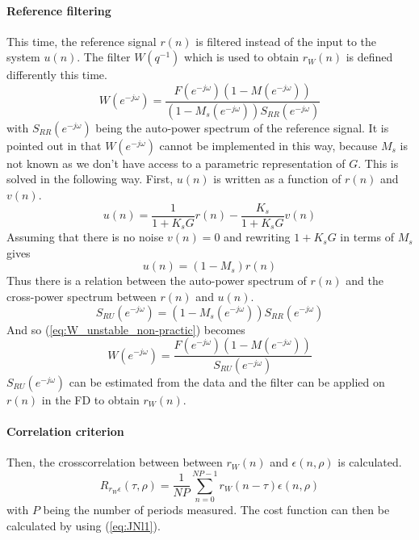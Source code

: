 \paragraph{Reference filtering}
This time, the reference signal $r(n)$ is filtered instead of the input to the system $u(n)$. The filter $W(q^{-1})$ which is used to obtain $r_W(n)$ is defined differently this time.
\begin{equation}
    W(e^{-j\omega}) = \frac{F(e^{-j\omega}) (1-M(e^{-j\omega}))}{(1-M_s(e^{-j\omega})) S_{RR}(e^{-j\omega})}
    \label{eq:W_unstable_non-practic}
\end{equation}
with $S_{RR}(e^{-j\omega})$ being the auto-power spectrum of the reference signal. It is pointed out in \cite{Data-driven_model_reference_control} that $W(e^{-j\omega})$ cannot be implemented in this way, because $M_s$ is not known as we don't have access to a parametric representation of $G$. This is solved in the following way. First, $u(n)$ is written as a function of $r(n)$ and $v(n)$.
\begin{equation*}
    u(n) = \frac{1}{1+K_s G} r(n) - \frac{K_s}{1+K_s G} v(n)
\end{equation*}
Assuming that there is no noise $v(n) = 0$ and rewriting $1+K_s G$ in terms of $M_s$ gives
\begin{equation*}
    u(n) = (1-M_s) r(n)
\end{equation*}
Thus there is a relation between the auto-power spectrum of $r(n)$ and the cross-power spectrum between $r(n)$ and $u(n)$.
\begin{equation*}
    S_{RU}(e^{-j\omega}) = (1-M_s(e^{-j\omega})) S_{RR}(e^{-j\omega})
\end{equation*}
And so (\ref{eq:W_unstable_non-practic}) becomes
\begin{equation*}
    W(e^{-j\omega}) = \frac{F(e^{-j\omega}) (1-M(e^{-j\omega}))}{S_{RU}(e^{-j\omega})}
\end{equation*}
$S_{RU}(e^{-j\omega})$ can be estimated from the data and the filter can be applied on $r(n)$ in the FD to obtain $r_W(n)$.

\paragraph{Correlation criterion}
Then, the crosscorrelation between between $r_W(n)$ and $\epsilon(n,\rho)$ is calculated.
\begin{equation*}
    R_{r_W \epsilon}(\tau,\rho) = \frac{1}{N\!P} \sum_{n=0}^{N\!P-1} r_W(n-\tau) \epsilon(n,\rho)
\end{equation*}
with $P$ being the number of periods measured. The cost function can then be calculated by using (\ref{eq:JNl1}).

